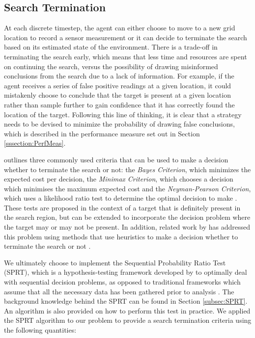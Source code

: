 
\subsection{Search Termination}\label{subsubsec:SeachTerminationMethodology}

At each discrete timestep, the agent can either choose to move to a new grid location to record a sensor measurement or it can decide to terminate the search based on its estimated state of the environment. There is a trade-off in terminating the search early, which means that less time and resources are spent on continuing the search, versus the possibility of drawing misinformed conclusions from the search due to a lack of information. For example, if the agent receives a series of false positive readings at a given location, it could mistakenly choose to conclude that the target is present at a given location rather than sample further to gain confidence that it has correctly found the location of the target. Following this line of thinking, it is clear that a strategy needs to be devised to minimize the probability of drawing false conclusions, which is described in the performance measure set out in Section \ref{sssection:PerfMeas}.\par
\citeauthor{Pollock1971SearchInterfaces} outlines three commonly used criteria that can be used to make a decision whether to terminate the search or not: the \textit{Bayes Criterion}, which minimizes the expected cost per decision, the \textit{Minimax Criterion}, which chooses a decision which minimises the maximum expected cost and the \textit{Neyman-Pearson Criterion}, which uses a likelihood ratio test to determine the optimal decision to make \cite{Pollock1971SearchInterfaces}. These tests are proposed in the context of a target that is definitely present in the search region, but can be extended to incorporate the decision problem where the target may or may not be present. In addition, related work by \citeauthor{Chung2007ASearch} has addressed this problem using methods that use heuristics to make a decision whether to terminate the search or not \cite{Chung2007ASearchb}. 

We ultimately choose to implement the Sequential Probability Ratio Test (SPRT), which is a hypothesis-testing framework developed by \citeauthor{Wald1950BayesProblems} to optimally deal with sequential decision problems, as opposed to traditional frameworks which assume that all the necessary data has been gathered prior to analysis \cite{Wald1950BayesProblems}. The background knowledge behind the SPRT can be found in Section \ref{subsec:SPRT}. An algorithm is also provided on how to perform this test in practice.
We applied the SPRT algorithm to our problem to provide a search termination criteria using the following quantities: 

